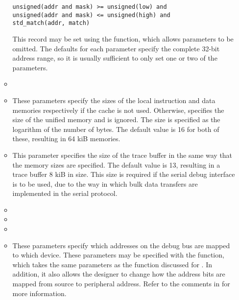 \begin{itemize}
\begin{itemize}
\begin{lstlisting}[numbers=none]
unsigned(addr and mask) >= unsigned(low) and
unsigned(addr and mask) <= unsigned(high) and
std_match(addr, match)
\end{lstlisting}

\noindent This record may be set using the  function, which
allows parameters to be omitted. The defaults for each parameter specify the
complete 32-bit address range, so it is usually sufficient to only set one or
two of the parameters.

\item {}
\item {}

These parameters specify the sizes of the local instruction and data memories 
respectively if the cache is not used. Otherwise,  
specifies the size of the unified memory and  is ignored.
The size is specified as the logarithm of the number of bytes. The default value
is 16 for both of these, resulting in 64 kiB memories.

\item {}

This parameter specifies the size of the trace buffer in the same way that the
memory sizes are specified. The default value is 13, resulting in a trace buffer
8 kiB in size. This size is required if the serial debug interface is to be
used, due to the way in which bulk data transfers are implemented in the serial
protocol.

\item {}
\item {}
\item {}
\item {}

These parameters specify which addresses on the debug bus are mapped to which 
device. These parameters may be specified with the  
function, which takes the same parameters as the  function 
discussed for . In addition, it also allows the designer 
to change how the address bits are mapped from source to peripheral address. 
Refer to the comments in  for more information.


\end{itemize}
\end{itemize}
